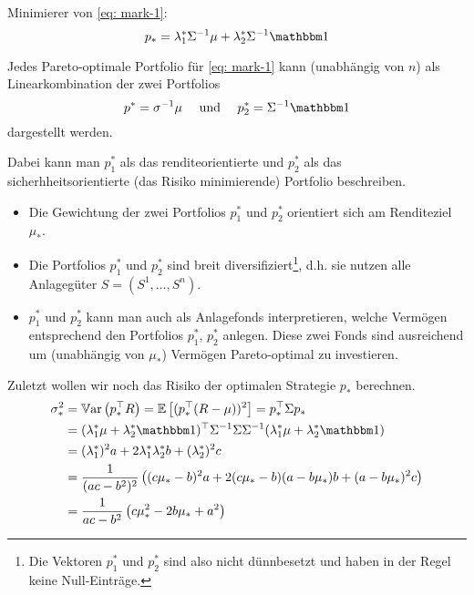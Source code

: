 Minimierer von \eqref{eq: mark-1}:
\begin{equation*}
	p_\ast = \lambda_1^\ast \Sigma^{-1} \mu + \lambda_2^\ast \Sigma^{-1} \one
\end{equation*}

\begin{korollar}
	Jedes Pareto-optimale Portfolio für \eqref{eq: mark-1} kann (unabhängig von $n$) als Linearkombination der zwei Portfolios
	\begin{equation*}
		p^\ast = \sigma^{-1} \mu \quad \und \quad p_2^\ast = \Sigma^{-1} \one
	\end{equation*}
	dargestellt werden.
\end{korollar}
Dabei kann man $p_1^\ast$ als das renditeorientierte und $p_2^\ast$ als das sicherhheitsorientierte (das Risiko minimierende) Portfolio beschreiben.

\begin{*bemerkung}
	\begin{itemize}[nolistsep]
		\item Die Gewichtung der zwei Portfolios $p_1^\ast$ und $p_2^\ast$ orientiert sich am Renditeziel $\mu_\ast$. 
		\item Die Portfolios $p_1^\ast$ und $p_2^\ast$ sind breit diversifiziert\footnote{Die Vektoren $p_1^\ast$ und $p_2^\ast$ sind also nicht dünnbesetzt und haben in der Regel keine Null-Einträge.}, d.h. sie nutzen alle Anlagegüter $S = (S^1, \dots, S^n)$. 
		\item $p_1^\ast$ und $p_2^\ast$ kann man auch als Anlagefonds interpretieren, welche Vermögen entsprechend den Portfolios $p_1^\ast$, $p_2^\ast$ anlegen. Diese zwei Fonds sind ausreichend um (unabhängig von $\mu_\ast$) Vermögen Pareto-optimal zu investieren.
	\end{itemize}
\end{*bemerkung}

Zuletzt wollen wir noch das Risiko der optimalen Strategie $p_\ast$ berechnen.
\begin{equation*}
	\begin{aligned}
		\sigma_\ast^2 &= \Var[\trans{p_\ast} R] = \EW[(\trans{p_\ast} (R - \mu))^2] = \trans{p_\ast} \Sigma p_\ast \\
		&= \trans{(\lambda_1^\ast \mu + \lambda_2^\ast \one)} \Sigma^{-1} \Sigma \Sigma^{-1} (\lambda_1^\ast \mu + \lambda_2^\ast \one) \\
		&= (\lambda_1^\ast)^2 a + 2 \lambda_1^\ast \lambda_2^\ast b + (\lambda_2^\ast)^2 c \\
		&= \frac{1}{(ac - b^2)^2} \brackets{(c\mu_\ast - b)^2 a + 2(c \mu_\ast - b)(a - b \mu_\ast) b + (a- b \mu_\ast)^2 c} \\
		&= \frac{1}{ac - b^2} \brackets{c \mu _\ast^2 - 2b\mu_\ast + a^2}
	\end{aligned}
\end{equation*}

